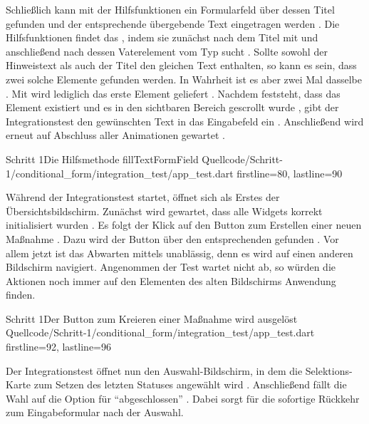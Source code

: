 Schließlich kann mit der Hilfsfunktionen  ein Formularfeld über dessen Titel gefunden und der entsprechende übergebende Text eingetragen werden \Lst{\ref{lst:Schritt1HilfsmethodeFillTextFormField}}.
Die Hilfsfunktionen findet das , indem sie zunächst nach dem Titel mit  und anschließend nach dessen Vaterelement vom Typ  sucht . Sollte sowohl der Hinweistext als auch der Titel den gleichen Text enthalten, so kann es sein, dass zwei solche Elemente gefunden werden. In Wahrheit ist es aber zwei Mal dasselbe . Mit  wird lediglich das erste Element geliefert .
Nachdem feststeht, dass das Element existiert  und es in den sichtbaren Bereich gescrollt wurde , gibt der Integrationstest den gewünschten Text in das Eingabefeld ein .
Anschließend wird erneut auf Abschluss aller Animationen gewartet .

\begin{alexlisting}{Schritt 1}{Die Hilfsmethode fillTextFormField}
  {Quellcode/Schritt-1/conditional_form/integration_test/app_test.dart}
  {firstline=80, lastline=90}
  \label{lst:Schritt1HilfsmethodeFillTextFormField}
\end{alexlisting}

Während der Integrationstest startet, öffnet sich als Erstes der Übersichtsbildschirm.
Zunächst wird gewartet, dass alle Widgets korrekt initialisiert wurden .
Es folgt der Klick auf den Button zum Erstellen einer neuen Maßnahme .
Dazu wird der Button über den entsprechenden  gefunden .
Vor allem jetzt ist das Abwarten mittels   unablässig, denn es wird auf einen anderen Bildschirm navigiert.
Angenommen der Test wartet nicht ab, so würden die Aktionen noch immer auf den Elementen des alten Bildschirms Anwendung finden. 

\begin{alexlisting}{Schritt 1}{Der Button zum Kreieren einer Maßnahme wird ausgelöst}
  {Quellcode/Schritt-1/conditional_form/integration_test/app_test.dart}
  {firstline=92, lastline=96}
  \label{lst:Schritt1ButtonKreierenMassnahmeAusgeloest}
\end{alexlisting}

Der Integrationstest öffnet nun den Auswahl-Bildschirm, in dem die Selektions-Karte zum Setzen des letzten Statuses angewählt wird .
Anschließend fällt die Wahl auf die Option für \enquote{abgeschlossen} .
Dabei sorgt  für die sofortige Rückkehr zum Eingabeformular nach der Auswahl.
 
